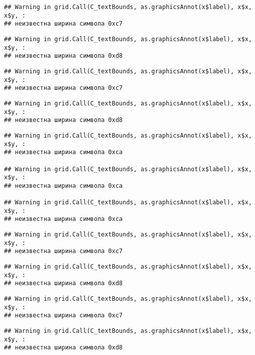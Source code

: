 \documentclass[
]{article}
\begin{document}
\begin{verbatim}
## Warning in grid.Call(C_textBounds, as.graphicsAnnot(x$label), x$x, x$y, :
## неизвестна ширина символа 0xc7
\end{verbatim}

\begin{verbatim}
## Warning in grid.Call(C_textBounds, as.graphicsAnnot(x$label), x$x, x$y, :
## неизвестна ширина символа 0xd8
\end{verbatim}

\begin{verbatim}
## Warning in grid.Call(C_textBounds, as.graphicsAnnot(x$label), x$x, x$y, :
## неизвестна ширина символа 0xc7
\end{verbatim}

\begin{verbatim}
## Warning in grid.Call(C_textBounds, as.graphicsAnnot(x$label), x$x, x$y, :
## неизвестна ширина символа 0xd8
\end{verbatim}

\begin{verbatim}
## Warning in grid.Call(C_textBounds, as.graphicsAnnot(x$label), x$x, x$y, :
## неизвестна ширина символа 0xca

## Warning in grid.Call(C_textBounds, as.graphicsAnnot(x$label), x$x, x$y, :
## неизвестна ширина символа 0xca

## Warning in grid.Call(C_textBounds, as.graphicsAnnot(x$label), x$x, x$y, :
## неизвестна ширина символа 0xca
\end{verbatim}

\begin{verbatim}
## Warning in grid.Call(C_textBounds, as.graphicsAnnot(x$label), x$x, x$y, :
## неизвестна ширина символа 0xc7
\end{verbatim}

\begin{verbatim}
## Warning in grid.Call(C_textBounds, as.graphicsAnnot(x$label), x$x, x$y, :
## неизвестна ширина символа 0xd8
\end{verbatim}

\begin{verbatim}
## Warning in grid.Call(C_textBounds, as.graphicsAnnot(x$label), x$x, x$y, :
## неизвестна ширина символа 0xc7
\end{verbatim}

\begin{verbatim}
## Warning in grid.Call(C_textBounds, as.graphicsAnnot(x$label), x$x, x$y, :
## неизвестна ширина символа 0xd8
\end{verbatim}
\end{document}
